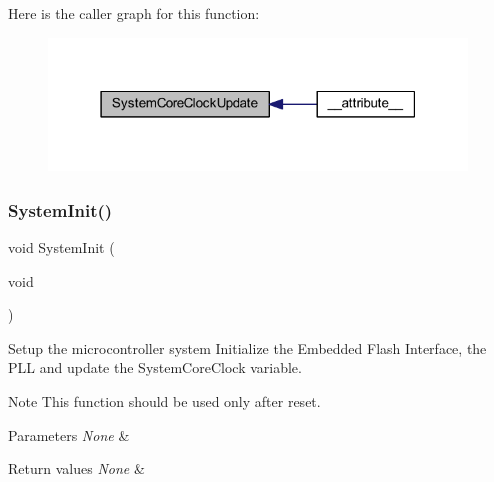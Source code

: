 Here is the caller graph for this function\+:
\nopagebreak
\begin{figure}[H]
\begin{center}
\leavevmode
\includegraphics[width=315pt]{group___s_t_m32_f10x___system___exported___functions_gae0c36a9591fe6e9c45ecb21a794f0f0f_icgraph}
\end{center}
\end{figure}
\mbox{\label{group___s_t_m32_f10x___system___exported___functions_ga93f514700ccf00d08dbdcff7f1224eb2}} 
\subsubsection{\texorpdfstring{System\+Init()}{SystemInit()}}
{\footnotesize\ttfamily void System\+Init (\begin{DoxyParamCaption}\item[{void}]{ }\end{DoxyParamCaption})}



Setup the microcontroller system Initialize the Embedded Flash Interface, the P\+LL and update the System\+Core\+Clock variable. 

\begin{DoxyNote}{Note}
This function should be used only after reset. 
\end{DoxyNote}

\begin{DoxyParams}{Parameters}
{\em None} & \\
\hline
\end{DoxyParams}

\begin{DoxyRetVals}{Return values}
{\em None} & \\
\hline
\end{DoxyRetVals}


